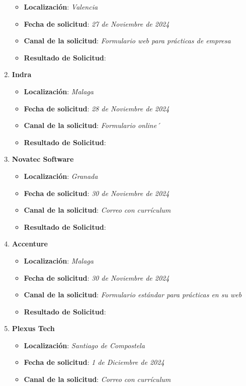 \begin{enumerate}
\begin{itemize}
		\item \textbf{Localización}: \textit{Valencia}
		\item \textbf{Fecha de solicitud}: \textit{27 de Noviembre de 2024}
		\item \textbf{Canal de la solicitud}: \textit{Formulario web para prácticas de empresa}
		\item \textbf{Resultado de Solicitud}: 
	\end{itemize}
	\item \textbf{Indra}
	\begin{itemize}
		\item \textbf{Localización}: \textit{Malaga}
		\item \textbf{Fecha de solicitud}: \textit{28 de Noviembre de 2024}
		\item \textbf{Canal de la solicitud}: \textit{Formulario online´}
		\item \textbf{Resultado de Solicitud}: 
	\end{itemize}
	\item \textbf{Novatec Software}
	\begin{itemize}
		\item \textbf{Localización}: \textit{Granada}
		\item \textbf{Fecha de solicitud}: \textit{30 de Noviembre de 2024}
		\item \textbf{Canal de la solicitud}: \textit{Correo con currículum}
		\item \textbf{Resultado de Solicitud}: 
	\end{itemize}
	\item \textbf{Accenture}
	\begin{itemize}
		\item \textbf{Localización}: \textit{Malaga}
		\item \textbf{Fecha de solicitud}: \textit{30 de Noviembre de 2024}
		\item \textbf{Canal de la solicitud}: \textit{Formulario estándar para prácticas en su web}
		\item \textbf{Resultado de Solicitud}: 
	\end{itemize}
		\item \textbf{Plexus Tech}
	\begin{itemize}
		\item \textbf{Localización}: \textit{Santiago de Compostela}
		\item \textbf{Fecha de solicitud}: \textit{1 de Diciembre de 2024}
		\item \textbf{Canal de la solicitud}: \textit{Correo con currículum}

\end{itemize}
\end{enumerate}
